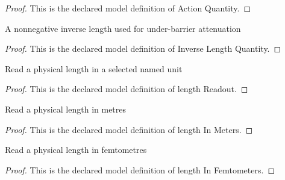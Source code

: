 \begin{proof}
  This is the declared model definition of Action Quantity.
\end{proof}
\begin{definition}
  \label{def:physics:phyx-mini-0660:phyxminiproblems-problemphyxmini0660-inverselengthquantity}
  A nonnegative inverse length used for under-barrier attenuation
\end{definition}
\begin{proof}
  This is the declared model definition of Inverse Length Quantity.
\end{proof}
\begin{definition}
  \label{def:physics:phyx-mini-0660:phyxminiproblems-problemphyxmini0660-lengthreadout}
  Read a physical length in a selected named unit
\end{definition}
\begin{proof}
  This is the declared model definition of length Readout.
\end{proof}
\begin{definition}
  \label{def:physics:phyx-mini-0660:phyxminiproblems-problemphyxmini0660-lengthinmeters}
  Read a physical length in metres
\end{definition}
\begin{proof}
  This is the declared model definition of length In Meters.
\end{proof}
\begin{definition}
  \label{def:physics:phyx-mini-0660:phyxminiproblems-problemphyxmini0660-lengthinfemtometers}
  Read a physical length in femtometres
\end{definition}
\begin{proof}
  This is the declared model definition of length In Femtometers.
\end{proof}
